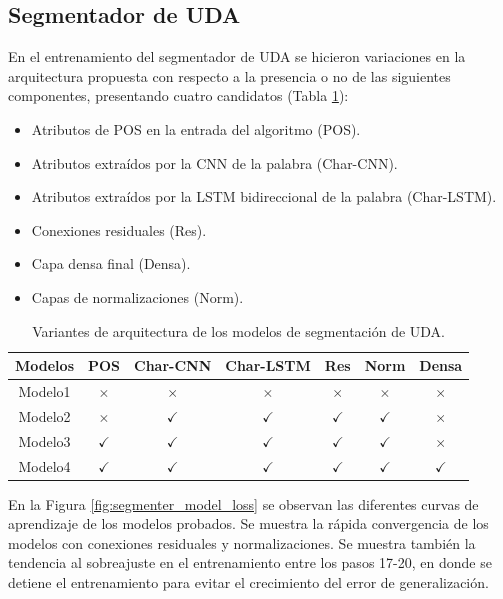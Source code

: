 \subsection{Segmentador de UDA}

En el entrenamiento del segmentador de UDA se hicieron variaciones en la arquitectura propuesta con respecto a la
presencia o no de las siguientes componentes, presentando cuatro candidatos (Tabla \ref{table:segmenter_architecture_table}):

\begin{itemize}
    \item Atributos de POS en la entrada del algoritmo (POS).
    \item Atributos extraídos por la CNN de la palabra (Char-CNN).
    \item Atributos extraídos por la LSTM bidireccional de la palabra (Char-LSTM).
    \item Conexiones residuales (Res).
    \item Capa densa final (Densa).
    \item Capas de normalizaciones (Norm).
\end{itemize}

\begin{table}[h!]
	\begin{center}
		\begin{tabular}{|c|c|c|c|c|c|c|} \hline
		Modelos 	& POS       & Char-CNN  & Char-LSTM & Res       & Norm      & Densa  \\ \hline
		Modelo1		& $\times$	& $\times$    & $\times$    & $\times$	& $\times$    & $\times$ \\ \hline
		Modelo2		& $\times$	& $\checkmark$    & $\checkmark$    & $\checkmark$	& $\checkmark$    & $\times$ \\ \hline
		Modelo3		& $\checkmark$	& $\checkmark$    & $\checkmark$    & $\checkmark$	& $\checkmark$    & $\times$ \\ \hline
		Modelo4		& $\checkmark$	& $\checkmark$    & $\checkmark$    & $\checkmark$	& $\checkmark$    & $\checkmark$ \\ \hline
		\end{tabular}
	\caption{Variantes de arquitectura de los modelos de segmentación de UDA.}\label{table:segmenter_architecture_table}
	\end{center}
\end{table}

En la Figura \ref{fig:segmenter_model_loss} se observan las diferentes curvas de aprendizaje de los modelos 
probados. Se muestra la rápida convergencia de los modelos con conexiones residuales y normalizaciones.
Se muestra también la tendencia al sobreajuste en el entrenamiento entre los pasos 17-20, en donde se detiene el 
entrenamiento para evitar el crecimiento del error de generalización.

